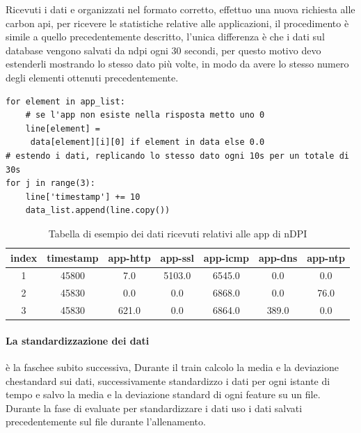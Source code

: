 Ricevuti i dati e organizzati nel formato corretto, effettuo una nuova richiesta alle carbon api, per ricevere le statistiche relative alle applicazioni, il procedimento è simile a quello precedentemente descritto, l'unica differenza è che i dati sul database vengono salvati da ndpi ogni 30 secondi, per questo motivo devo estenderli mostrando lo stesso dato più volte, in modo da avere lo stesso numero degli elementi ottenuti precedentemente.

\begin{lstlisting}[language=python3]
for element in app_list:
    # se l'app non esiste nella risposta metto uno 0
    line[element] =
     data[element][i][0] if element in data else 0.0
# estendo i dati, replicando lo stesso dato ogni 10s per un totale di 30s
for j in range(3):
    line['timestamp'] += 10
    data_list.append(line.copy())
\end{lstlisting}

\begin{table}[]

    \begin{tabular}{||c c c c c c c||} 
    \hline
    index & timestamp  & app-http & app-ssl & app-icmp & app-dns & app-ntp \\ [0.5ex] 
    \hline\hline
    1 & 45800 & 7.0 & 5103.0 & 6545.0 & 0.0 &  0.0\\ 
    \hline
    2 & 45830 & 0.0 & 0.0 & 6868.0& 0.0 &  76.0 \\
    \hline
    3 & 45830 & 621.0 & 0.0 & 6864.0 & 389.0  &  0.0 \\
    \hline
    \end{tabular}
    \caption{Tabella di esempio dei dati ricevuti relativi alle app di nDPI}
    \label{table:tabella_dati_2}
\end{table}


\paragraph{La standardizzazione dei dati} è la faschee subito successiva, 
Durante il train calcolo la media e la deviazione chestandard sui dati, successivamente standardizzo  i dati per ogni istante di tempo e salvo la media e la deviazione standard di ogni feature su un file.
Durante la fase di evaluate per standardizzare i dati uso i dati salvati precedentemente sul file durante l'allenamento.

